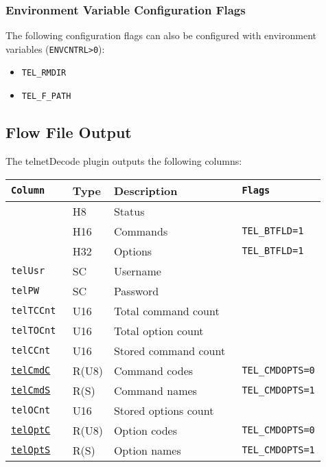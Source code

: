 \documentclass[documentation]{subfiles}
\begin{document}
\subsubsection{Environment Variable Configuration Flags}
The following configuration flags can also be configured with environment variables ({\tt ENVCNTRL>0}):
\begin{itemize}
    \item {\tt TEL\_RMDIR}
    \item {\tt TEL\_F\_PATH}
\end{itemize}

\subsection{Flow File Output}
The telnetDecode plugin outputs the following columns:
\begin{longtable}{>{\tt}lll>{\tt\small}l}
    \toprule
    {\bf Column} & {\bf Type} & {\bf Description} & {\bf Flags}\\
    \midrule\endhead%
    \nameref{telStat}          & H8    & Status               & \\
    \nameref{telCmdBF}         & H16   & Commands             & TEL\_BTFLD=1\\
    \nameref{telOptBF}         & H32   & Options              & TEL\_BTFLD=1\\
    telUsr                     & SC    & Username             & \\
    telPW                      & SC    & Password             & \\
    telTCCnt                   & U16   & Total command count  & \\
    telTOCnt                   & U16   & Total option count   & \\
    telCCnt                    & U16   & Stored command count & \\
    \hyperref[telCmd]{telCmdC} & R(U8) & Command codes        & TEL\_CMDOPTS=0\\
    \hyperref[telCmd]{telCmdS} & R(S)  & Command names        & TEL\_CMDOPTS=1\\
    telOCnt                    & U16   & Stored options count & \\
    \hyperref[telOpt]{telOptC} & R(U8) & Option codes         & TEL\_CMDOPTS=0\\
    \hyperref[telOpt]{telOptS} & R(S)  & Option names         & TEL\_CMDOPTS=1\\
    \bottomrule
\end{longtable}
\end{document}
